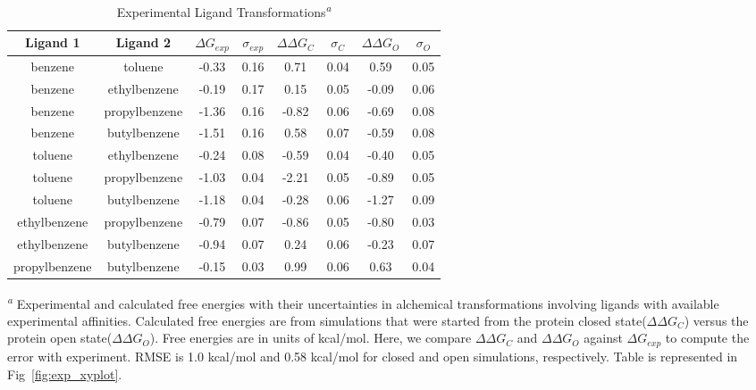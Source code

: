 \begin{table}[!htb]
\centering
\caption{Experimental Ligand Transformations\textsuperscript{\emph{a}}}
\label{tbl:exp_set}
\begin{tabular}{|c|c|c|c|c|c|c|c|}
\hline
\textbf{Ligand 1} & \textbf{Ligand 2}  & \boldmath$\Delta G_{exp}$  & \boldmath$\sigma_{exp}$ & \boldmath$\Delta\Delta G_{C}$ & \boldmath$\sigma_{C}$ & \boldmath$\Delta\Delta G_{O}$ & \boldmath$\sigma_{O}$ \\ \hline
benzene         & toluene         & -0.33        & 0.16            & 0.71       & 0.04          & 0.59       & 0.05          \\ \hline
benzene         & ethylbenzene    & -0.19        & 0.17            & 0.15       & 0.05          & -0.09      & 0.06          \\ \hline
benzene         & propylbenzene & -1.36        & 0.16            & -0.82      & 0.06          & -0.69      & 0.08          \\ \hline
benzene         & butylbenzene  & -1.51        & 0.16            & 0.58       & 0.07          & -0.59      & 0.08          \\ \hline
toluene         & ethylbenzene    & -0.24        & 0.08            & -0.59      & 0.04          & -0.40      & 0.05          \\ \hline
toluene         & propylbenzene & -1.03        & 0.04            & -2.21      & 0.05          & -0.89      & 0.05          \\ \hline
toluene         & butylbenzene  & -1.18        & 0.04            & -0.28      & 0.06          & -1.27       & 0.09         \\ \hline
ethylbenzene    & propylbenzene & -0.79        & 0.07            & -0.86      & 0.05          & -0.80       & 0.03         \\ \hline
ethylbenzene    & butylbenzene  & -0.94        & 0.07            & 0.24       & 0.06          & -0.23      & 0.07          \\ \hline
propylbenzene & butylbenzene  & -0.15        & 0.03            & 0.99       & 0.06          & 0.63       & 0.04          \\ \hline
\end{tabular}

\textsuperscript{\emph{a}} Experimental and calculated free energies with their uncertainties in alchemical transformations involving ligands with available experimental affinities.
Calculated free energies are from simulations that were started from the protein closed state(\boldmath$\Delta\Delta G_{C}$) versus the protein open state(\boldmath$\Delta\Delta G_{O}$). 
Free energies are in units of kcal/mol.
Here, we compare \boldmath$\Delta\Delta G_{C}$ and \boldmath$\Delta\Delta G_{O}$ against \boldmath$\Delta G_{exp}$ to compute the error with experiment.
RMSE is 1.0 kcal/mol and 0.58 kcal/mol for closed and open simulations, respectively.
Table is represented in Fig~\ref{fig:exp_xyplot}.
\end{table}

